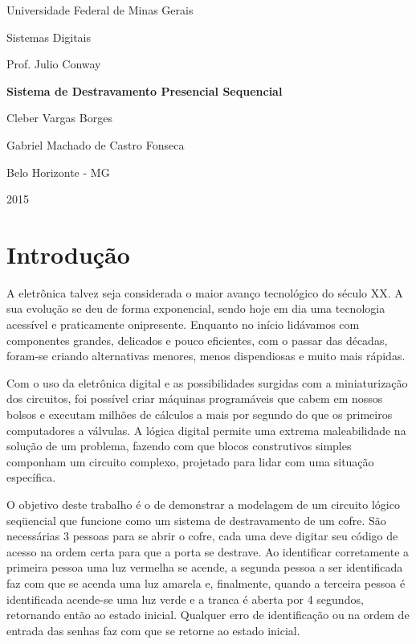 \documentclass[12pt,a4paper]{article}
\begin{document}
\thispagestyle{empty}
\begin{center}
{\Large\sc Universidade Federal de Minas Gerais}

{\large Sistemas Digitais}

Prof. Julio Conway

\vfill
{\LARGE\bf Sistema de Destravamento Presencial Sequencial}

\medskip
Cleber Vargas Borges

Gabriel Machado de Castro Fonseca

\vfill
Belo Horizonte - MG

2015
\end{center}
\newpage

\section{Introdução}

A eletrônica talvez seja considerada o maior avanço tecnológico do século XX. A sua evolução se deu de forma exponencial, sendo hoje em dia uma tecnologia acessível e praticamente onipresente. Enquanto no início lidávamos com componentes grandes, delicados e pouco eficientes, com o passar das décadas, foram-se criando alternativas menores, menos dispendiosas e muito mais rápidas.

Com o uso da eletrônica digital e as possibilidades surgidas com a miniaturização dos circuitos, foi possível criar máquinas programáveis que cabem em nossos bolsos e executam milhões de cálculos a mais por segundo do que os primeiros computadores a válvulas. A lógica digital permite uma extrema maleabilidade na solução de um problema, fazendo com que blocos construtivos simples componham um circuito complexo, projetado para lidar com uma situação específica.

O objetivo deste trabalho é o de demonstrar a modelagem de um circuito lógico seqüencial que funcione como um sistema de destravamento de um cofre. São necessárias 3 pessoas para se abrir o cofre, cada uma deve digitar seu código de acesso na ordem certa para que a porta se destrave. Ao identificar corretamente a primeira pessoa uma luz vermelha se acende, a segunda pessoa a ser identificada faz com que se acenda uma luz amarela e, finalmente, quando a terceira pessoa é identificada acende-se uma luz verde e a tranca é aberta por 4 segundos, retornando então ao estado inicial. Qualquer erro de identificação ou na ordem de entrada das senhas faz com que se retorne ao estado inicial.
\end{document}
